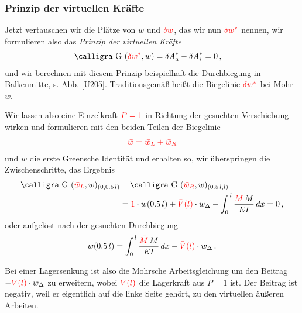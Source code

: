 {{{{{\textcolor{sectionTitleBlue}{\subsubsection*{Prinzip der virtuellen Kr\"{a}fte}}}

Jetzt vertauschen wir die Pl\"{a}tze von $w $ und $\textcolor{red}{\delta w}$, das wir nun $\textcolor{red}{\delta w^*}$ nennen, wir formulieren also das {\em Prinzip der virtuellen Kr\"{a}fte\/}
\begin{align}
\text{\normalfont\calligra G\,\,}(\textcolor{red}{\delta w^*}, w) &= \delta A_a^* - \delta A_i^* = 0\,,
\end{align}
und wir berechnen mit diesem Prinzip beispielhaft die Durchbiegung in Balkenmitte, s. Abb. \ref{U205}. Traditionsgem\"{a}{\ss} hei{\ss}t die Biegelinie $\textcolor{red}{\delta w^*}$ bei Mohr $\bar{w}$.

Wir lassen also eine Einzelkraft $\textcolor{red}{\bar{P} = 1}$ in Richtung der gesuchten Verschiebung wirken und formulieren mit den beiden Teilen der Biegelinie
\begin{align}
\textcolor{red}{\bar{w} = \bar{w}_L + \bar{w}_R }
\end{align}
und $w$ die erste Greensche Identit\"{a}t und erhalten so, wir \"{u}berspringen die Zwischenschritte, das Ergebnis
\begin{align}
\text{\normalfont\calligra G\,\,}(\textcolor{red}{\bar{w}_L},w)_{(0,0.5\,l)}  &+ \text{\normalfont\calligra G\,\,}(\textcolor{red}{\bar{w}_R},w)_{(0.5\,l, l)} \nn \\
&= \textcolor{red}{\bar{1}} \cdot w(0.5\,l) + \textcolor{red}{\bar{V}(l)} \cdot w_{\Delta} - \int_0^{\,l} \frac{\textcolor{red}{\bar{M}}\,M}{EI}\,dx = 0\,,
\end{align}
oder aufgel\"{o}st nach der gesuchten Durchbiegung
\begin{align}
w(0.5\,l) = \int_0^{\,l} \frac{\textcolor{red}{\bar{M}}\,M}{EI}\,dx - \textcolor{red}{\bar{V}(l)} \cdot w_{\Delta}\,.
\end{align}

\hspace*{-12pt}\colorbox{highlightBlue}{\parbox{0.98\textwidth}{Bei einer Lagersenkung ist also die Mohrsche Arbeitsgleichung um den Beitrag $ -\textcolor{red}{\bar{V}(l)} \cdot w_{\Delta} $ zu erweitern, wobei $ \textcolor{red}{\bar{V}(l)}$ die Lagerkraft aus $\bar{P} = 1 $ ist. Der Beitrag ist negativ, weil er eigentlich auf die linke Seite geh\"{o}rt, zu den virtuellen \"{a}u{\ss}eren Arbeiten.}}\\

}}}}
